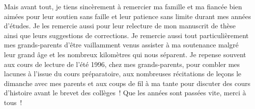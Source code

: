 Mais avant tout, je tiens sincèrement à remercier ma famille et ma fiancée bien aimées pour leur soutien sans faille et leur patience sans limite durant mes années d'études. Je les remercie aussi pour leur relecture de mon manuscrit de thèse ainsi que leurs suggestions de corrections. Je remercie aussi tout particulièrement mes grands-parents d'être vaillamment venus assister à ma soutenance malgré leur grand âge et les nombreux kilomètres qui nous séparent. Je repense souvent aux cours de lecture de l'été 1996, chez mes grands-parents, pour combler mes lacunes à l'issue du cours préparatoire, aux nombreuses récitations de leçons le dimanche avec mes parents et aux coups de fil à ma tante pour discuter des cours d'histoire avant le brevet des collèges~! Que les années sont passées vite, merci à tous~!